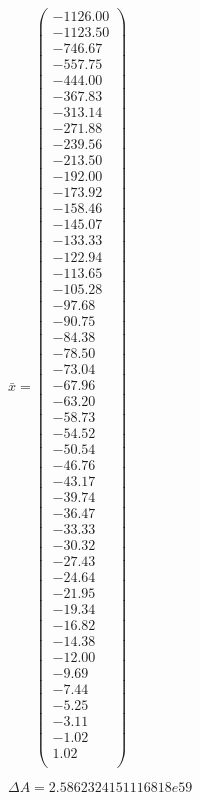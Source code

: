 \documentclass[a4paper,12pt]{article}
\begin{document}
$\bar { x } = \begin{pmatrix}
-1126.00 \\
-1123.50 \\
-746.67 \\
-557.75 \\
-444.00 \\
-367.83 \\
-313.14 \\
-271.88 \\
-239.56 \\
-213.50 \\
-192.00 \\
-173.92 \\
-158.46 \\
-145.07 \\
-133.33 \\
-122.94 \\
-113.65 \\
-105.28 \\
-97.68 \\
-90.75 \\
-84.38 \\
-78.50 \\
-73.04 \\
-67.96 \\
-63.20 \\
-58.73 \\
-54.52 \\
-50.54 \\
-46.76 \\
-43.17 \\
-39.74 \\
-36.47 \\
-33.33 \\
-30.32 \\
-27.43 \\
-24.64 \\
-21.95 \\
-19.34 \\
-16.82 \\
-14.38 \\
-12.00 \\
-9.69 \\
-7.44 \\
-5.25 \\
-3.11 \\
-1.02 \\
1.02 \\
\end{pmatrix}
$

$\Delta A = 2.5862324151116818e59$
\end{document}
